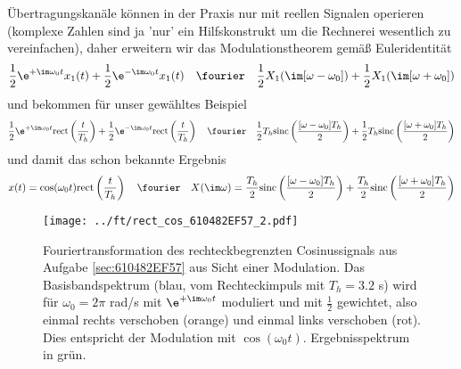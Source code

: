 \begin{ExCalc}
Übertragungskanäle können in der Praxis nur mit reellen Signalen operieren
(komplexe Zahlen sind ja 'nur' ein Hilfskonstrukt um die Rechnerei wesentlich zu
vereinfachen), daher
erweitern wir das Modulationstheorem gemäß Euleridentität
\begin{equation}
  \frac{1}{2}\e^{+\im\omega_0 t} x_1(t) + \frac{1}{2}\e^{-\im\omega_0 t} x_1(t)
  \quad\fourier\quad
  \frac{1}{2}X_1(\im[\omega-\omega_0]) + \frac{1}{2}X_1(\im[\omega+\omega_0])
\end{equation}
und bekommen für unser gewähltes Beispiel
\begin{equation}
  \frac{1}{2}\e^{+\im\omega_0 t} \mathrm{rect}\left(\frac{t}{T_h}\right) +
  \frac{1}{2}\e^{-\im\omega_0 t} \mathrm{rect}\left(\frac{t}{T_h}\right)
  \quad\fourier\quad
  \frac{1}{2}T_h \mathrm{sinc}\left(\frac{[\omega-\omega_0] T_h}{2}\right) +
  \frac{1}{2}T_h \mathrm{sinc}\left(\frac{[\omega+\omega_0] T_h}{2}\right)
\end{equation}
und damit das schon bekannte Ergebnis
\begin{equation}
  x(t) = \cos(\omega_0 t) \mathrm{rect}\left(\frac{t}{T_h}\right)
  \quad\fourier\quad
  X(\im\omega) = \frac{T_h}{2} \mathrm{sinc}\left(\frac{[\omega-\omega_0] T_h}{2}\right) +
  \frac{T_h}{2} \mathrm{sinc}\left(\frac{[\omega+\omega_0] T_h}{2}\right)
\end{equation}

\end{ExCalc}

\begin{figure}[h]
\centering
  \texttt{[image: ../ft/rect\_cos\_610482EF57\_2.pdf]}
  \caption{Fouriertransformation des rechteckbegrenzten Cosinussignals
  aus Aufgabe \ref{sec:610482EF57} aus Sicht einer Modulation.
  Das Basisbandspektrum (blau, vom Rechteckimpuls mit $T_h=3.2$ s)
  wird für $\omega_0=2\pi$ rad/s mit
  $\e^{+\im\omega_0 t}$ moduliert und mit $\frac{1}{2}$ gewichtet, also einmal
  rechts verschoben (orange) und einmal links verschoben (rot). Dies entspricht
  der Modulation mit $\cos(\omega_0 t)$. Ergebnisspektrum in grün.}
  \label{fig:rect_cos_610482EF57_2}
\end{figure}


